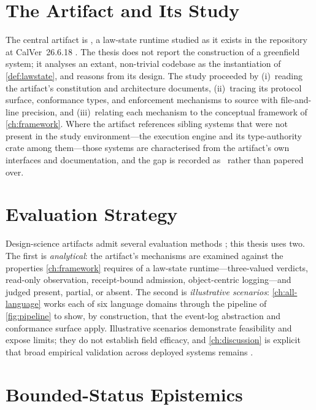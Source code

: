 \section{The Artifact and Its Study}
\label{sec:m-artifact}

The central artifact is \lspmax, a law-state runtime studied as it exists in the
repository at CalVer~26.6.18 \citep{lspmax}. The thesis does not report the
construction of a greenfield system; it analyses an extant, non-trivial codebase
as the instantiation of \cref{def:lawstate}, and reasons from its design. The
study proceeded by (i)~reading the artifact's constitution and architecture
documents, (ii)~tracing its protocol surface, conformance types, and enforcement
mechanisms to source with file-and-line precision, and (iii)~relating each
mechanism to the conceptual framework of \cref{ch:framework}. Where the artifact
references sibling systems that were not present in the study environment---the
 execution engine and its type-authority crate among them---those
systems are characterised from the artifact's own interfaces and documentation,
and the gap is recorded as \unknownstat\ rather than papered over.

\section{Evaluation Strategy}
\label{sec:m-eval}

Design-science artifacts admit several evaluation methods \citep{hevner2004};
this thesis uses two. The first is \emph{analytical}: the artifact's mechanisms
are examined against the properties \cref{ch:framework} requires of a law-state
runtime---three-valued verdicts, read-only observation, receipt-bound admission,
object-centric logging---and judged present, partial, or absent. The second is
\emph{illustrative scenarios}: \cref{ch:all-language} works each of six language
domains through the pipeline of \cref{fig:pipeline} to show, by construction, that
the event-log abstraction and conformance surface apply. Illustrative scenarios
demonstrate feasibility and expose limits; they do not establish field efficacy,
and \cref{ch:discussion} is explicit that broad empirical validation across
deployed systems remains \openstat.

\section{Bounded-Status Epistemics}
\label{sec:m-epistemics}

